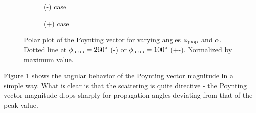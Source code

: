\documentclass[11pt,twoside]{eitExjobb}
\begin{document}
	\begin{figure}[h]
		\centering
		\begin{subfigure}{\textwidth}
			\resizebox{\textwidth}{!}{
				
			}
			\caption{(-) case}
		\end{subfigure}
		\begin{subfigure}{\textwidth}
			\resizebox{\textwidth}{!}{
				
			}
			\caption{(+) case}
		\end{subfigure}
		\caption{\label{fig:res-angle-sweep-polar} Polar plot of the Poynting vector for varying angles $\phi_{\mathrm{prop}}$ and $\alpha$. Dotted line at $\phi_{\mathrm{prop}} = 260^\circ$ (-) or $\phi_{\mathrm{prop}} = 100^\circ$ (+-). Normalized by maximum value.}
	\end{figure}
	Figure \ref{fig:res-angle-sweep-polar} shows the angular behavior of the Poynting vector magnitude in a simple way. What is clear is that the scattering is quite directive - the Poynting vector magnitude drops sharply for propagation angles deviating from that of the peak value.
	
\end{document}
